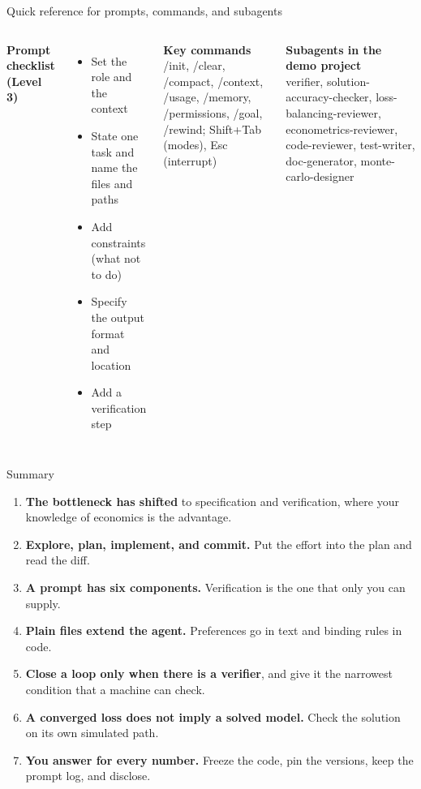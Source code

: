 \documentclass[aspectratio=169,10pt]{beamer}
\newcommand{\emphc}[1]{\textcolor{harvardcrimson}{#1}}
\begin{document}
\begin{frame}{Quick reference for prompts, commands, and subagents}
\begin{columns}[T]
\textbf{\textcolor{uzhblue}{Prompt checklist (Level 3)}}
\begin{itemize}\itemsep4pt
  \item[$\square$] Set the role and the context
  \item[$\square$] State one task and name the files and paths
  \item[$\square$] Add constraints (what not to do)
  \item[$\square$] Specify the output format and location
  \item[$\square$] Add a verification step
\end{itemize}
\textbf{\textcolor{uzhblue}{Key commands}}\\[3pt]
{\small\ttfamily /init, /clear, /compact, /context, /usage, /memory, /permissions, /goal, /rewind; Shift+Tab (modes), Esc (interrupt)}

\vspace{1.1em}
\textbf{\textcolor{uzhblue}{Subagents in the demo project}}\\[3pt]
{\small verifier, solution-accuracy-checker, loss-balancing-reviewer, econometrics-reviewer, code-reviewer, test-writer, doc-generator, monte-carlo-designer}
\end{columns}
\end{frame}

\begin{frame}{Summary}
\begin{enumerate}\itemsep6pt
  \item \textbf{The bottleneck has shifted} to \emphc{specification and verification}, where your knowledge of economics is the advantage.
  \item \textbf{Explore, plan, implement, and commit.} Put the effort into the plan and read the diff.
  \item \textbf{A prompt has six components.} Verification is the one that only you can supply.
  \item \textbf{Plain files extend the agent.} Preferences go in text and binding rules in code.
  \item \textbf{Close a loop only when there is a verifier}, and give it the narrowest condition that a machine can check.
  \item \textbf{A converged loss does not imply a solved model.} Check the solution on its own simulated path.
  \item \textbf{You answer for every number.} Freeze the code, pin the versions, keep the prompt log, and disclose.
\end{enumerate}
\end{frame}
\end{document}
